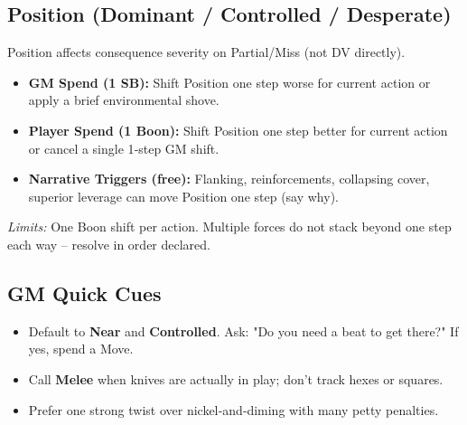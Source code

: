 \subsection{Position (Dominant / Controlled / Desperate)}
Position affects consequence severity on Partial/Miss (not DV directly).
\begin{itemize}
  \item \textbf{GM Spend (1 SB):} Shift Position one step worse for current action or apply a brief environmental shove.
  \item \textbf{Player Spend (1 Boon):} Shift Position one step better for current action or cancel a single 1‑step GM shift.
  \item \textbf{Narrative Triggers (free):} Flanking, reinforcements, collapsing cover, superior leverage can move Position one step (say why).
\end{itemize}
\emph{Limits:} One Boon shift per action. Multiple forces do not stack beyond one step each way -- resolve in order declared.

\subsection{GM Quick Cues}
\begin{itemize}
  \item Default to \textbf{Near} and \textbf{Controlled}. Ask: "Do you need a beat to get there?" If yes, spend a Move.
  \item Call \textbf{Melee} when knives are actually in play; don't track hexes or squares.
  \item Prefer one strong twist over nickel‑and‑diming with many petty penalties.
\end{itemize}